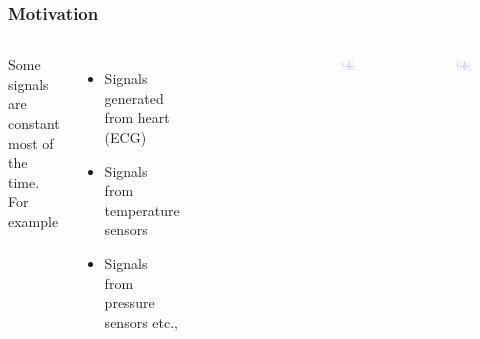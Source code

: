 \documentclass{beamer}
\begin{document}
\begin{frame}
	\frametitle{Motivation} \footnotesize
	\begin{center}
		\begin{columns}[c]
		\column{2.5 in}
			\hspace{2 mm} \scriptsize{Some signals are constant most of the time. For example} \\
 			\vspace{2 mm}
			\begin{itemize} \scriptsize
				\item{Signals generated from heart (ECG)}
				\item{Signals from temperature sensors}
				\item{Signals from pressure sensors etc.,}
			\end{itemize}
			\begin{center}
				\begin{figure}
					\includegraphics[width=4 cm,height=2.5 cm,angle=360]{Figures/01ECGSignal.ps}
				\end{figure}
				\scriptsize{ \color{blue}{Electrocardiogram(ECG) signal}} \\
			\end{center}
		\column{2.5 in}
			\begin{center}
				\begin{figure}
					\includegraphics[width=4.5 cm,height=2.5 cm,angle=360]{Figures/02ECGSignal.ps}
				\end{figure}
				\scriptsize{ \color{blue}{Nyquist sampling for ECG signal}}
			\end{center}
			\begin{center}
				\begin{figure}
					\includegraphics[width=4.5 cm,height=2.5 cm,angle=360]{Figures/03ECGSignal.ps}
				\end{figure}
				\scriptsize{ \color{blue}{Level cross sampling for ECG signal}}
			\end{center}
		\end{columns}
	\end{center}
\end{frame}
\end{document}
